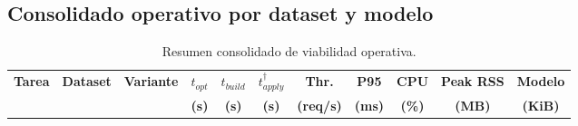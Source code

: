 \documentclass[12pt,oneside]{report}
\begin{document}
\subsection{Consolidado operativo por dataset y modelo}
\begin{table}[H]
\centering
\caption{Resumen consolidado de viabilidad operativa.}
\label{tab:waf-consolidado}
\scriptsize
\renewcommand{\arraystretch}{1.10}
\begin{adjustbox}{max width=\textwidth}
\begin{tabular}{lllcccccccc}
\toprule
\textbf{Tarea} & \textbf{Dataset} & \textbf{Variante} & $t_{opt}$ & $t_{build}$ & $t_{apply}^{\dagger}$ & \textbf{Thr.} & \textbf{P95} & \textbf{CPU} & \textbf{Peak RSS} & \textbf{Modelo} \\
 &  &  & \textbf{(s)} & \textbf{(s)} & \textbf{(s)} & \textbf{(req/s)} & \textbf{(ms)} & \textbf{(\%)} & \textbf{(MB)} & \textbf{(KiB)} \\
\midrule

\end{tabular}
\end{adjustbox}
\end{table}
\end{document}
